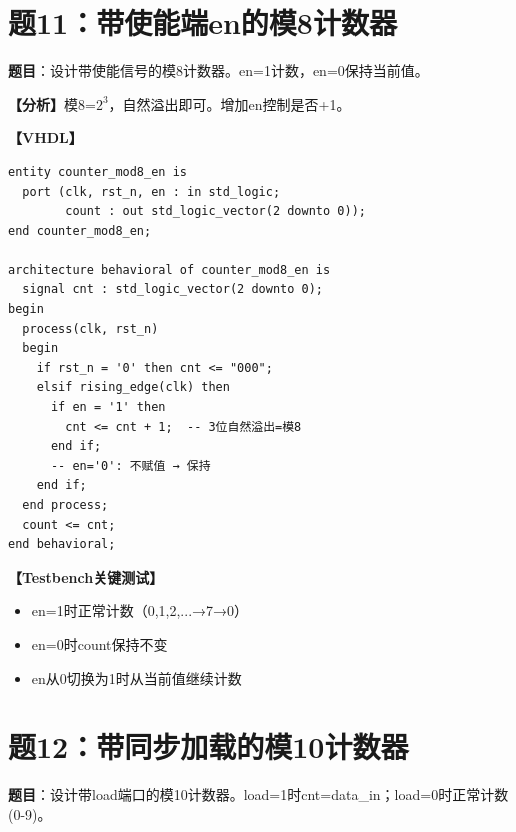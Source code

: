 \section{题11：带使能端en的模8计数器}

\textbf{题目}：设计带使能信号的模8计数器。en=1计数，en=0保持当前值。

\begin{solution}[完整解答]

\textbf{【分析】}模8=$2^3$，自然溢出即可。增加en控制是否+1。

\textbf{【VHDL】}
\begin{lstlisting}
entity counter_mod8_en is
  port (clk, rst_n, en : in std_logic;
        count : out std_logic_vector(2 downto 0));
end counter_mod8_en;

architecture behavioral of counter_mod8_en is
  signal cnt : std_logic_vector(2 downto 0);
begin
  process(clk, rst_n)
  begin
    if rst_n = '0' then cnt <= "000";
    elsif rising_edge(clk) then
      if en = '1' then
        cnt <= cnt + 1;  -- 3位自然溢出=模8
      end if;
      -- en='0': 不赋值 → 保持
    end if;
  end process;
  count <= cnt;
end behavioral;
\end{lstlisting}

\textbf{【Testbench关键测试】}
\begin{itemize}
  \item en=1时正常计数（0,1,2,...→7→0）
  \item en=0时count保持不变
  \item en从0切换为1时从当前值继续计数
\end{itemize}

\end{solution}


\section{题12：带同步加载的模10计数器}

\textbf{题目}：设计带load端口的模10计数器。load=1时cnt=data\_in；load=0时正常计数(0-9)。

